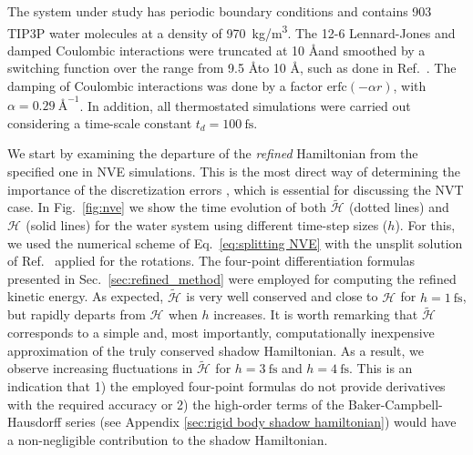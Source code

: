 \documentclass[
journal=jctcce,
layout=twocolumn
]{achemso}
\newcommand{\Ham}[1]{{\mathcal H}_\text{#1}}    %
\newcommand{\timestep}{h}
\newcommand{\refined}[1]{\widetilde{#1}}
\begin{document}
The system under study has periodic boundary conditions and contains 903 TIP3P \cite{Jorgensen_1983} water molecules at a density of 970~kg/m\textsuperscript{3}.
The 12-6 Lennard-Jones and damped Coulombic interactions were truncated at 10 \AA and smoothed by a switching function over the range from 9.5 \AA to 10 \AA, such as done in Ref.~. 
The damping of Coulombic interactions was done by a factor $\text{erfc}(-\alpha r)$, with $\alpha = 0.29~\text{\AA}^{-1}$.
In addition, all thermostated simulations were carried out considering a time-scale constant $t_d = 100~\text{fs}$.

We start by examining the departure of the \textit{refined} Hamiltonian from the specified one in NVE simulations.
This is the most direct way of determining the importance of the discretization errors \cite{Engle_2005}, which is essential for discussing the NVT case.
In Fig.~\ref{fig:nve} we show the time evolution of both $\refined{\Ham{}}$ (dotted lines) and $\Ham{}$ (solid lines) for the water system using different time-step sizes ($\timestep$).
For this, we used the numerical scheme of Eq.~\eqref{eq:splitting NVE} with the unsplit solution of Ref.~ applied for the rotations.
The four-point differentiation formulas presented in Sec.~\ref{sec:refined_method} were employed for computing the refined kinetic energy.
As expected, $\refined{\Ham{}}$ is very well conserved and close to $\Ham{}$ for $\timestep = 1~\text{fs}$, but rapidly departs from $\Ham{}$ when $\timestep$ increases.
It is worth remarking that $\refined{\Ham{}}$ corresponds to a simple and, most importantly, computationally inexpensive approximation of the truly conserved shadow Hamiltonian.
As a result, we observe increasing fluctuations in $\refined{\Ham{}}$ for $\timestep = 3~\text{fs}$ and $\timestep = 4~\text{fs}$.
This is an indication that
1) the employed four-point formulas do not provide derivatives with the required accuracy or
2) the high-order terms of the Baker-Campbell-Hausdorff series (see Appendix \ref{sec:rigid body shadow hamiltonian}) would have a non-negligible contribution to the shadow Hamiltonian.
\end{document}
